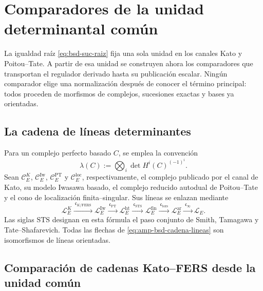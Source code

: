 
\section{Comparadores de la unidad determinantal común}
\label{sec:amp-bsd-comparadores}

La igualdad raíz \eqref{eq:bsd-suc-raiz} fija una sola unidad en los canales
Kato y Poitou--Tate. A partir de esa unidad se construyen ahora los
comparadores que transportan el regulador derivado hasta su publicación
escalar. Ningún comparador elige una normalización después de conocer el
término principal: todos proceden de morfismos de complejos, sucesiones
exactas y bases ya orientadas.

\subsection{La cadena de líneas determinantes}
\label{subsec:amp-bsd-lineas}

Para un complejo perfecto basado \(C\), se emplea la convención
\begin{equation}\label{eq:amp-bsd-linea-determinante}
 \lambda(C):=\bigotimes_i
 \det H^i(C)^{(-1)^i}.
\end{equation}
Sean \(\mathcal C_E^K\), \(\mathcal C_E^{\mathrm{Iw}}\),
\(\mathcal C_E^{\mathrm{PT}}\) y \(\mathcal C_E^{\mathrm{loc}}\),
respectivamente, el complejo publicado por el canal de Kato, su modelo
Iwasawa basado, el complejo reducido autodual de Poitou--Tate y el cono de
localización finita--singular. Sus líneas se enlazan mediante
\begin{equation}\label{eq:amp-bsd-cadena-lineas}
 \mathcal L_E^K
 \xrightarrow{\ \mathfrak c_{K/\mathrm{FERS}}\ }
 \mathcal L_E^{\mathrm{Iw}}
 \xrightarrow{\ \mathfrak c_{\mathrm{PT}}\ }
 \mathcal L_E^{\mathrm{ht}}
 \xrightarrow{\ \mathfrak c_{\mathrm{STS}}\ }
 \mathcal L_E^{\mathrm{fin}}
 \xrightarrow{\ \mathfrak c_{\mathrm{tors}}\ }
 \mathcal L_E^{\mathrm{ar}}
 \xrightarrow{\ \mathfrak c_{\infty}\ }
 \mathcal L_E.
\end{equation}
Las siglas \(\mathrm{STS}\) designan en esta fórmula el paso conjunto de
Smith, Tamagawa y Tate--Shafarevich. Todas las flechas de
\eqref{eq:amp-bsd-cadena-lineas} son isomorfismos de líneas orientadas.

\subsection{Comparación de cadenas Kato--FERS desde la unidad común}
\label{subsec:amp-bsd-comparacion-cadenas-kato-fers}

